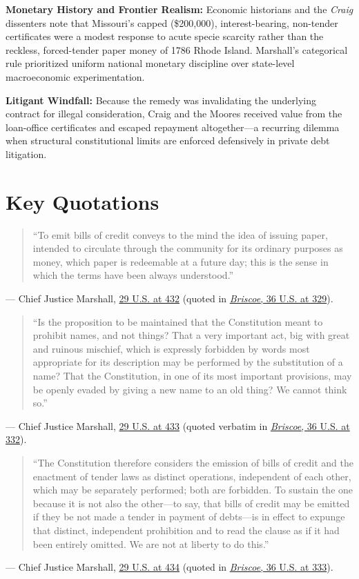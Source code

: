 \documentclass[12pt]{article}
\begin{document}
\textbf{Monetary History and Frontier Realism:} Economic historians and the \textit{Craig} dissenters note that Missouri's capped (\$200,000), interest-bearing, non-tender certificates were a modest response to acute specie scarcity rather than the reckless, forced-tender paper money of 1786 Rhode Island. Marshall's categorical rule prioritized uniform national monetary discipline over state-level macroeconomic experimentation.

\textbf{Litigant Windfall:} Because the remedy was invalidating the underlying contract for illegal consideration, Craig and the Moores received value from the loan-office certificates and escaped repayment altogether---a recurring dilemma when structural constitutional limits are enforced defensively in private debt litigation.

\section{Key Quotations}
\begin{quote}
``To emit bills of credit conveys to the mind the idea of issuing paper, intended to circulate through the community for its ordinary purposes as money, which paper is redeemable at a future day; this is the sense in which the terms have been always understood.''
\end{quote}
\noindent --- Chief Justice Marshall, \href{https://supreme.justia.com/cases/federal/us/29/410/}{29 U.S. at 432} (quoted in \href{https://supreme.justia.com/cases/federal/us/36/257/}{\textit{Briscoe}, 36 U.S. at 329}).

\begin{quote}
``Is the proposition to be maintained that the Constitution meant to prohibit names, and not things? That a very important act, big with great and ruinous mischief, which is expressly forbidden by words most appropriate for its description may be performed by the substitution of a name? That the Constitution, in one of its most important provisions, may be openly evaded by giving a new name to an old thing? We cannot think so.''
\end{quote}
\noindent --- Chief Justice Marshall, \href{https://supreme.justia.com/cases/federal/us/29/410/}{29 U.S. at 433} (quoted verbatim in \href{https://supreme.justia.com/cases/federal/us/36/257/}{\textit{Briscoe}, 36 U.S. at 332}).

\begin{quote}
``The Constitution therefore considers the emission of bills of credit and the enactment of tender laws as distinct operations, independent of each other, which may be separately performed; both are forbidden. To sustain the one because it is not also the other---to say, that bills of credit may be emitted if they be not made a tender in payment of debts---is in effect to expunge that distinct, independent prohibition and to read the clause as if it had been entirely omitted. We are not at liberty to do this.''
\end{quote}
\noindent --- Chief Justice Marshall, \href{https://supreme.justia.com/cases/federal/us/29/410/}{29 U.S. at 434} (quoted in \href{https://supreme.justia.com/cases/federal/us/36/257/}{\textit{Briscoe}, 36 U.S. at 333}).
\end{document}
